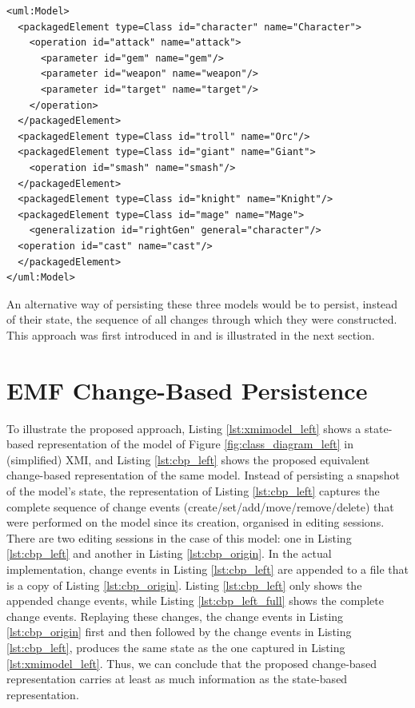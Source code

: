 \vspace{-20pt}
\begin{lstlisting}[style=xmi,caption={Simplified XMI file of the right version of Figure \ref{fig:class_diagram_right}.},label=lst:xmimodel_right]
<uml:Model>
  <packagedElement type=Class id="character" name="Character">
    <operation id="attack" name="attack">
      <parameter id="gem" name="gem"/>
      <parameter id="weapon" name="weapon"/>
      <parameter id="target" name="target"/>
    </operation>
  </packagedElement>
  <packagedElement type=Class id="troll" name="Orc"/>
  <packagedElement type=Class id="giant" name="Giant">
    <operation id="smash" name="smash"/>
  </packagedElement>
  <packagedElement type=Class id="knight" name="Knight"/>
  <packagedElement type=Class id="mage" name="Mage">
    <generalization id="rightGen" general="character"/>
  <operation id="cast" name="cast"/>
  </packagedElement>
</uml:Model>
\end{lstlisting}

An alternative way of persisting these three models would be to persist, instead of their state, the sequence of all changes through which they were constructed. This approach was first introduced in \cite{DBLP:conf/models/YohannisKP17} and is illustrated in the next section.


\section{EMF Change-Based Persistence}
\label{sec:emf_change_based_persistence}

To illustrate the proposed approach, Listing \ref{lst:xmimodel_left} shows a state-based representation of the model of Figure \ref{fig:class_diagram_left} in (simplified) XMI, and Listing \ref{lst:cbp_left} shows the proposed equivalent change-based representation of the same model. Instead of persisting a snapshot of the model's state, the representation of Listing \ref{lst:cbp_left} captures the complete sequence of change events (create/set/add/move/remove/delete) that were performed on the model since its creation, organised in editing sessions. There are two editing sessions in the case of this model: one in Listing \ref{lst:cbp_left} and another in Listing \ref{lst:cbp_origin}. In the actual implementation, change events in Listing \ref{lst:cbp_left} are appended to a file that is a copy of Listing \ref{lst:cbp_origin}. Listing \ref{lst:cbp_left} only shows the appended change events, while Listing \ref{lst:cbp_left_full} shows the complete change events. Replaying these changes, the change events in Listing \ref{lst:cbp_origin} first and then followed by the change events in Listing \ref{lst:cbp_left}, produces the same state as the one captured in Listing \ref{lst:xmimodel_left}. Thus, we can conclude that the proposed change-based representation carries at least as much information as the state-based representation. 

